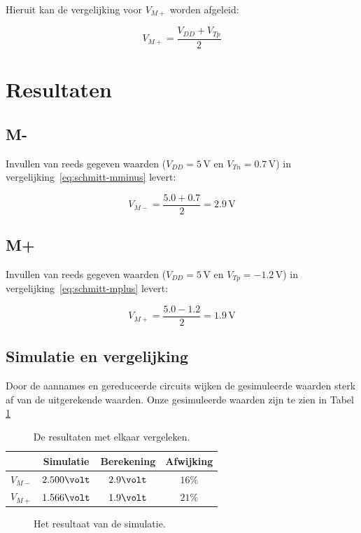 \documentclass{scrartcl}  %
\begin{document}
Hieruit kan de vergelijking voor $V_{M+}$ worden afgeleid:

\begin{equation} \label{eq:schmitt-mplus}
V_{M+} = \frac{V_{DD}+V_{Tp}}{2}
\end{equation}

\section{Resultaten}
\label{sec:trig-res}
\subsection{M-}
\label{subsec:trig-res-mminus}
Invullen van reeds gegeven waarden ($V_{DD} = 5 \,\textrm{V}$ en $V_{Tn} = 0.7 \,\textrm{V}$) in vergelijking~\ref{eq:schmitt-mminus} levert:

\begin{equation} \label{eq:schmitt-mminus-val}
V_{M-} = \frac{5.0+0.7}{2} = 2.9 \,\textrm{V}
\end{equation}

\subsection{M+}
\label{subsec:trig-res-mplus}
Invullen van reeds gegeven waarden ($V_{DD} = 5 \,\textrm{V}$ en $V_{Tp} = -1.2 \,\textrm{V}$) in vergelijking~\ref{eq:schmitt-mplus} levert:

\begin{equation} \label{eq:schmitt-mplus-val}
V_{M+} = \frac{5.0-1.2}{2} = 1.9 \,\textrm{V}
\end{equation}

\subsection{Simulatie en vergelijking}
\label{subsec:trig-res-verg}
Door de aannames en gereduceerde circuits wijken de gesimuleerde waarden sterk af van de uitgerekende waarden. Onze gesimuleerde waarden zijn te zien in Tabel \ref{tab:trig-results}

\begin{table}[H]
\centering
\caption{De resultaten met elkaar vergeleken.}
\label{tab:trig-results}
\begin{tabular}{c c c c}
\hline\hline
 & Simulatie & Berekening & Afwijking \\
 \hline
$V_{M-}$ & $2.500\volt$ & $2.9\volt$ & $16\%$ \\
$V_{M+}$ & $1.566\volt$ & $1.9\volt$ & $21\%$ \\
  \hline
\end{tabular}
\end{table}
\begin{figure}[H]
\centering
	\setlength{} 
	\setlength{}
	
	\caption{Het resultaat van de simulatie.}
	\label{fig:st}
\end{figure}
\end{document}
